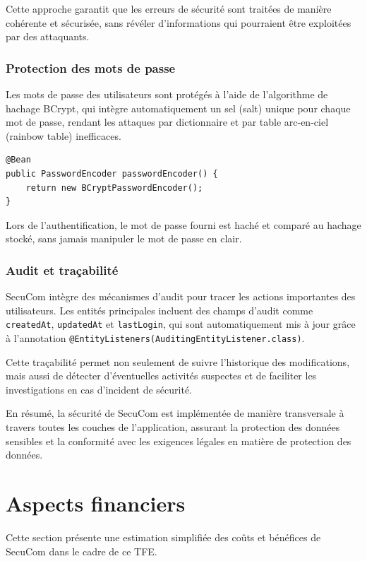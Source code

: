 \documentclass[12pt,a4paper]{report}
\begin{document}
Cette approche garantit que les erreurs de sécurité sont traitées de manière cohérente et sécurisée, sans révéler d'informations qui pourraient être exploitées par des attaquants.

\subsection{Protection des mots de passe}

Les mots de passe des utilisateurs sont protégés à l'aide de l'algorithme de hachage BCrypt, qui intègre automatiquement un sel (salt) unique pour chaque mot de passe, rendant les attaques par dictionnaire et par table arc-en-ciel (rainbow table) inefficaces.

\begin{lstlisting}
@Bean
public PasswordEncoder passwordEncoder() {
    return new BCryptPasswordEncoder();
}
\end{lstlisting}

Lors de l'authentification, le mot de passe fourni est haché et comparé au hachage stocké, sans jamais manipuler le mot de passe en clair.

\subsection{Audit et traçabilité}

SecuCom intègre des mécanismes d'audit pour tracer les actions importantes des utilisateurs. Les entités principales incluent des champs d'audit comme \texttt{createdAt}, \texttt{updatedAt} et \texttt{lastLogin}, qui sont automatiquement mis à jour grâce à l'annotation \texttt{@EntityListeners(AuditingEntityListener.class)}.

Cette traçabilité permet non seulement de suivre l'historique des modifications, mais aussi de détecter d'éventuelles activités suspectes et de faciliter les investigations en cas d'incident de sécurité.

En résumé, la sécurité de SecuCom est implémentée de manière transversale à travers toutes les couches de l'application, assurant la protection des données sensibles et la conformité avec les exigences légales en matière de protection des données.

\chapter{Aspects financiers}

Cette section présente une estimation simplifiée des coûts et bénéfices de SecuCom dans le cadre de ce TFE.
\end{document}
